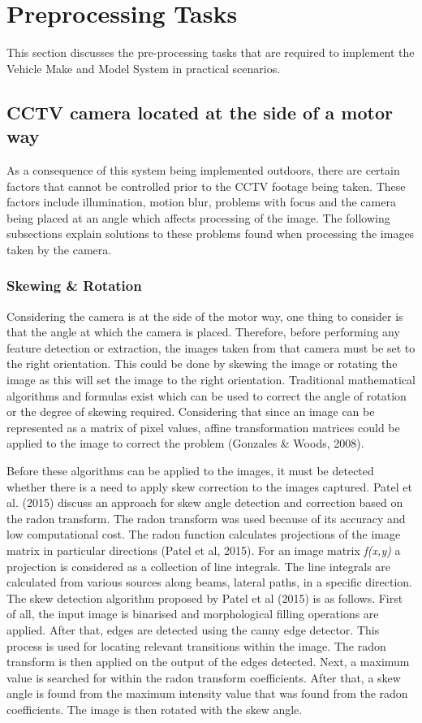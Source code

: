 \documentclass[a4paper, 16pt]{article}
\begin{document}
 \section{Preprocessing Tasks}
 This section discusses the pre-processing tasks that are required to implement the Vehicle Make and Model System in practical scenarios.
 
 \subsection{CCTV camera located at the side of a motor way}
 As a consequence of this system being implemented outdoors, there are certain factors that cannot be controlled prior to the CCTV footage being taken. These factors include illumination, motion blur, problems with focus and the camera being placed at an angle  which affects processing of the image. The following subsections explain solutions to these problems found when processing the images taken by the camera. 
 
 \subsubsection{Skewing \& Rotation}
Considering the camera is at the side of the motor way, one thing to consider is that the angle at which the camera is placed. Therefore, before performing any feature detection or extraction, the images taken from that camera must be set to the right orientation. This could be done by skewing the image or rotating the image as this will set the image to the right orientation. Traditional mathematical algorithms and formulas exist which can be used to correct the angle of rotation or the degree of skewing required. Considering that since an image can be represented as a matrix of pixel values, affine transformation matrices could be applied to the image to correct the problem (Gonzales \& Woods, 2008).
\parskip 0.2in 

Before these algorithms can be applied to the images, it must be detected whether there is a need to apply skew correction to the images captured. Patel et al. (2015) discuss an approach for skew angle detection and correction based on the radon transform. The radon transform was used because of its accuracy and low computational cost. The radon function calculates projections of the image matrix in particular directions (Patel et al, 2015). For an image matrix \textit{f(x,y)} a projection is considered as a collection of line integrals. The line integrals are calculated from various sources along beams, lateral paths, in a specific direction. The skew detection algorithm proposed by Patel et al (2015) is as follows. First of all, the input image is binarised and morphological filling operations are applied. After that, edges are detected using the canny edge detector. This process is used for locating relevant transitions within the image. The radon transform is then applied on the output of the edges detected. Next, a maximum value is searched for within the radon transform coefficients. After that, a skew angle is found from the maximum intensity value that was found from the radon coefficients. The image is then rotated with the skew angle. 
\end{document}

